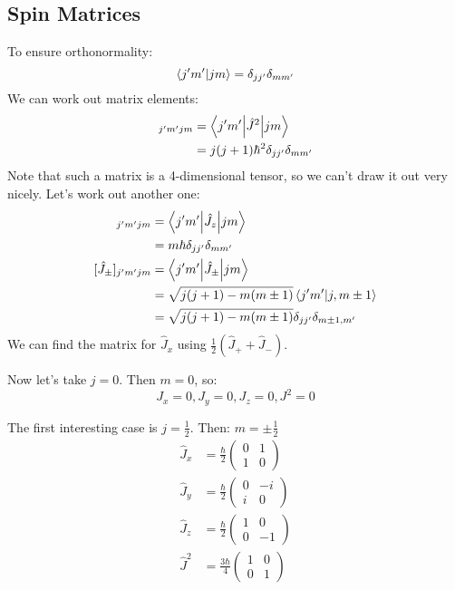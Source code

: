 \subsection{Spin Matrices}
To ensure orthonormality:
\[ \bra{j'm'}\ket{jm} = \delta_{j j'} \delta_{m m'} \]
We can work out matrix elements:
\begin{align*}
    [\hat{J}^2]_{j'm'jm} &= \mel**{j'm'}{\hat{J}^2}{jm} \\
    &= j(j + 1) \hbar^2 \delta_{j j'} \delta_{mm'}
\end{align*}
Note that such a matrix is a 4-dimensional tensor, so we can't draw it out very nicely. Let's work out another one:
\begin{align*}
    [\hat{J}_z]_{j'm'jm} &= \mel**{j'm'}{\hat{J}_z}{jm} \\
    &= m\hbar \delta_{j j'} \delta_{mm'} \\
    [\hat{J}_{\pm}]_{j'm'jm} &= \mel**{j'm'}{\hat{J}_{\pm}}{jm} \\
    &= \sqrt{j(j + 1) - m (m \pm 1)} \bra{j'm'}\ket{j, m \pm 1} \\
    &= \sqrt{j(j + 1) - m (m \pm 1)} \delta_{j j'} \delta_{m \pm 1, m'} \\
\end{align*}
We can find the matrix for $\hat{J}_x$ using $\frac{1}{2}(\hat{J}_{+} + \hat{J}_{-})$.

Now let's take $j = 0$. Then $m = 0$, so:
\[ J_x = 0, J_y = 0, J_z = 0, J^2 = 0 \]

The first interesting case is $j = \frac{1}{2}$. Then: $m = \pm \frac{1}{2}$
\begin{align*}
    \hat{J}_x &= \frac{\hbar}{2} \begin{pmatrix}
        0 & 1 \\ 1 & 0
    \end{pmatrix} \\
    \hat{J}_y &= \frac{\hbar}{2} \begin{pmatrix}
        0 & -i \\ i & 0
    \end{pmatrix} \\
    \hat{J}_z &= \frac{\hbar}{2} \begin{pmatrix}
        1 & 0 \\ 0 & -1
    \end{pmatrix} \\
    \hat{J}^2 &= \frac{3\hbar}{4} \begin{pmatrix}
        1 & 0 \\ 0 & 1
    \end{pmatrix}
\end{align*}

